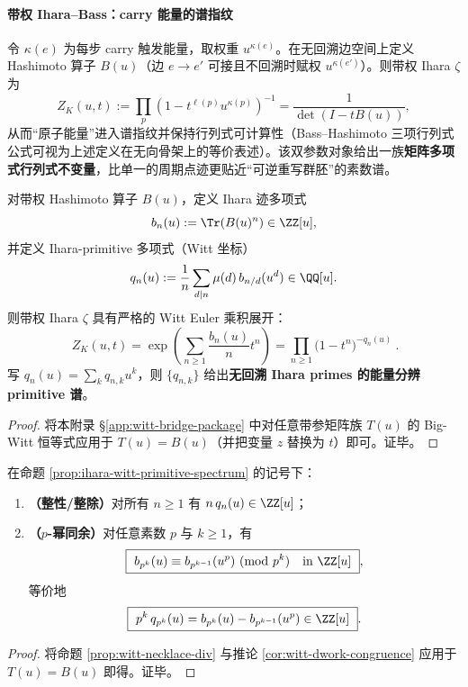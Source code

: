 \paragraph{带权 Ihara--Bass：carry 能量的谱指纹}
令 $\kappa(e)$ 为每步 carry 触发能量，取权重 $u^{\kappa(e)}$。在无回溯边空间上定义 Hashimoto 算子 $B(u)$（边 $e\to e'$ 可接且不回溯时赋权 $u^{\kappa(e')}$）。则带权 Ihara \(\zeta\) 为
\[
Z_K(u,t):=\prod_{p}\left(1-t^{\ell(p)}u^{\kappa(p)}\right)^{-1}
=\frac{1}{\det(I-tB(u))},
\]
从而“原子能量”进入谱指纹并保持行列式可计算性（Bass--Hashimoto 三项行列式公式可视为上述定义在无向骨架上的等价表述）。该双参数对象给出一族\textbf{矩阵多项式行列式不变量}，比单一的周期点迹更贴近“可逆重写群胚”的素数谱。

\begin{proposition}\label{prop:ihara-witt-primitive-spectrum}
对带权 Hashimoto 算子 \(B(u)\)，定义 Ihara 迹多项式
\[
b_n(u):=\Tr(B(u)^n)\in\ZZ[u],
\]
并定义 Ihara-primitive 多项式（Witt 坐标）
\[
q_n(u):=\frac{1}{n}\sum_{d\mid n}\mu(d)\,b_{n/d}(u^d)\in\QQ[u].
\]
则带权 Ihara \(\zeta\) 具有严格的 Witt Euler 乘积展开：
\[
\boxed{\ 
Z_K(u,t)
=\exp\!\left(\sum_{n\ge 1}\frac{b_n(u)}{n}t^n\right)
=\prod_{n\ge 1}\bigl(1-t^n\bigr)^{-q_n(u)}
\ }.
\]
写 \(q_n(u)=\sum_k q_{n,k}u^k\)，则 \(\{q_{n,k}\}\) 给出\textbf{无回溯 Ihara primes 的能量分辨 primitive 谱}。
\end{proposition}
\begin{proof}
将本附录 \S\ref{app:witt-bridge-package} 中对任意带参矩阵族 \(T(u)\) 的 Big-Witt 恒等式应用于 \(T(u)=B(u)\)（并把变量 \(z\) 替换为 \(t\)）即可。证毕。
\end{proof}

\begin{corollary}\label{cor:ihara-witt-dwork}
在命题 \ref{prop:ihara-witt-primitive-spectrum} 的记号下：
\begin{enumerate}
  \item \textbf{（整性/整除）}对所有 \(n\ge 1\) 有 \(n\,q_n(u)\in\ZZ[u]\)；
  \item \textbf{（\(p\)-幂同余）}对任意素数 \(p\) 与 \(k\ge 1\)，有
  \[
  \boxed{\ b_{p^k}(u)\equiv b_{p^{k-1}}(u^p)\ (\mathrm{mod}\ p^k)\quad\text{in }\ZZ[u]\ },
  \]
  等价地
  \[
  \boxed{\ p^k\,q_{p^k}(u)=b_{p^k}(u)-b_{p^{k-1}}(u^p)\in\ZZ[u]\ }.
\]
\end{enumerate}
\end{corollary}
\begin{proof}
将命题 \ref{prop:witt-necklace-div} 与推论 \ref{cor:witt-dwork-congruence} 应用于 \(T(u)=B(u)\) 即得。证毕。
\end{proof}

